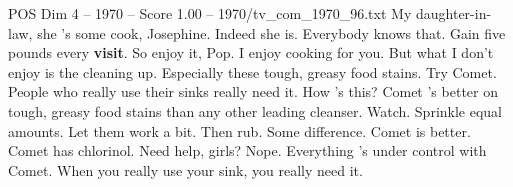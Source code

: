 \begin{textsample}{POS Dim 4 – 1970 – Score 1.00 – 1970/tv\_com\_1970\_96.txt}  \label{ex:f4_pos_034}
My daughter-in-law, she 's some cook, Josephine.
Indeed she is.
Everybody knows that.
Gain five pounds every \textbf{visit}.
So enjoy it, Pop.
I enjoy cooking for you.
But what I don't enjoy is the cleaning up.
Especially these tough, greasy food stains.
Try Comet.
People who really use their sinks really need it.
How 's this?
Comet 's better on tough, greasy food stains than any other leading cleanser.
Watch.
Sprinkle equal amounts.
Let them work a bit.
Then rub.
Some difference.
Comet is better.
Comet has chlorinol.
Need help, girls?
Nope.
Everything 's under control with Comet.
When you really use your sink, you really need it.

\end{textsample}
